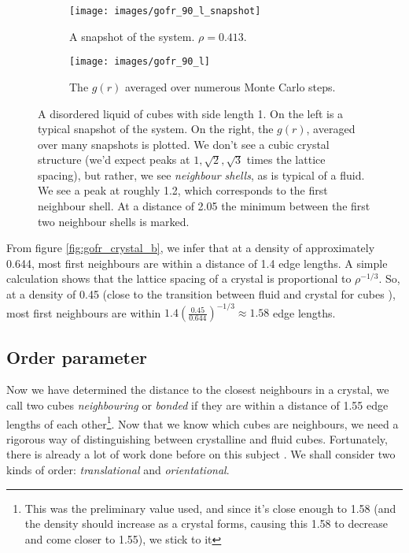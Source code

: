 \documentclass[thesis]{subfiles}
\begin{document}
\begin{figure}[H]
	\centering
	\vspace{-8pt}
\begin{subfigure}{0.3\textwidth}
	\centering
	\vspace{8pt}
	\texttt{[image: images/gofr\_90\_l\_snapshot]}
	\vspace{10pt}
	\caption{A snapshot of the system. $\rho = 0.413$.}
\end{subfigure}
\begin{subfigure}{0.5\textwidth}
	\centering
	\texttt{[image: images/gofr\_90\_l]}
	\caption{The $g(r)$ averaged over numerous Monte Carlo steps.}
\end{subfigure}
\caption{A disordered liquid of cubes with side length 1. On the left is a typical snapshot of the system. On the right, the $g(r)$, averaged over many snapshots is plotted. We don't see a cubic crystal structure (we'd expect peaks at $1, \sqrt 2, \sqrt 3$ times the lattice spacing), but rather, we see \emph{neighbour shells}, as is typical of a fluid. We see a peak at roughly 1.2, which corresponds to the first neighbour shell. At a distance of 2.05 the minimum between the first two neighbour shells is marked.}
\end{figure}
From figure \ref{fig:gofr_crystal_b}, we infer that at a density of approximately 0.644, most first neighbours are within a distance of 1.4 edge lengths. A simple calculation shows  that the lattice spacing of a crystal is proportional to $\rho^{-1/3}$. So, at a density of 0.45 (close to the transition between fluid and crystal for cubes \cite{van2017phase}), most first neighbours are within $1.4 \left( \frac{0.45}{0.644}\right)^{-1/3} \approx 1.58$ edge lengths. 

\subsection{Order parameter}
Now we have determined the distance to the closest neighbours in a crystal, we call two cubes \emph{neighbouring} or \emph{bonded} if they are within a distance of 1.55 edge lengths of each other\footnote{This was the preliminary value used, and since it's close enough to 1.58 (and the density should increase as a crystal forms, causing this 1.58 to decrease and come closer to 1.55), we stick to it}. Now that we know which cubes are neighbours, we need a rigorous way of distinguishing between crystalline and fluid cubes. Fortunately, there is already a lot of work done before on this subject \cite{steinhardt1983bond, lechner2008accurate, van2017phase, sharma2018disorder, mickel2013shortcomings}. We shall consider two kinds of order: \emph{translational} and \emph{orientational}.
\end{document}
